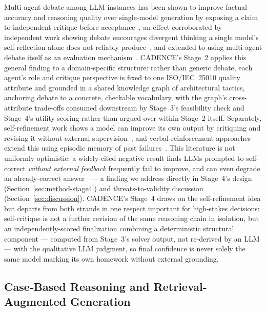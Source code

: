 \documentclass[lettersize,journal]{IEEEtran}
\begin{document}
Multi-agent debate among LLM instances has been shown to improve factual accuracy and reasoning quality over single-model generation by exposing a claim to independent critique before acceptance~\cite{duetal2023debate}, an effect corroborated by independent work showing debate encourages divergent thinking a single model's self-reflection alone does not reliably produce~\cite{liang2024divergent}, and extended to using multi-agent debate itself as an evaluation mechanism~\cite{chan2024chateval}. CADENCE's Stage~2 applies this general finding to a domain-specific structure: rather than generic debate, each agent's role and critique perspective is fixed to one ISO/IEC~25010 quality attribute and grounded in a shared knowledge graph of architectural tactics, anchoring debate to a concrete, checkable vocabulary, with the graph's cross-attribute trade-offs consumed downstream by Stage~3's feasibility check and Stage~4's utility scoring rather than argued over within Stage~2 itself. Separately, self-refinement work shows a model can improve its own output by critiquing and revising it without external supervision~\cite{madaan2023selfrefine}, and verbal-reinforcement approaches extend this using episodic memory of past failures~\cite{shinn2023reflexion}. This literature is not uniformly optimistic: a widely-cited negative result finds LLMs prompted to self-correct \emph{without external feedback} frequently fail to improve, and can even degrade an already-correct answer~\cite{huang2024selfcorrect} --- a finding we address directly in Stage~4's design (Section~\ref{sec:method-stage4}) and threats-to-validity discussion (Section~\ref{sec:discussion}). CADENCE's Stage~4 draws on the self-refinement idea but departs from both strands in one respect important for high-stakes decisions: self-critique is not a further revision of the same reasoning chain in isolation, but an independently-scored finalization combining a deterministic structural component --- computed from Stage~3's solver output, not re-derived by an LLM --- with the qualitative LLM judgment, so final confidence is never solely the same model marking its own homework without external grounding.

\subsection{Case-Based Reasoning and Retrieval-Augmented Generation}
\end{document}
